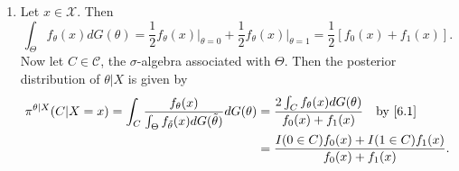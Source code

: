 \documentclass[12pt]{article}
\begin{document}
\begin{enumerate}
  \item Let $x \in \mathcal{X}$. Then
    \begin{equation}
      \int_{\Theta}f_{\theta}(x)dG(\theta) = \frac{1}{2}f_{\theta}(x)\bigg|_{\theta = 0} + \frac{1}{2}f_{\theta}(x)\bigg|_{\theta = 1} =
      \frac{1}{2}[f_0(x) + f_1(x)].
      \label{6.1}
    \end{equation}
    Now let $C \in \mathcal{C}$, the $\sigma$-algebra associated with $\Theta$. Then the posterior distribution of $\theta | X$ is given by
    \begin{align*}
      \pi^{\theta|X}(C|X=x) = \int_{C} \frac{f_{\theta}(x)}{\int_{\Theta}f_{\tilde{\theta}}(x)dG(\tilde{\theta})}dG(\theta) 
      & = \frac{ 2\int_{C}f_{\theta}(x)dG(\theta) }{ f_0(x) + f_1(x) } \ \ \text{ by \eqref{6.1}} \\
      & = \frac{ I(0 \in C) f_0(x) + I(1 \in C)f_1(x) }{ f_0(x) + f_1(x) }.
    \end{align*}


\end{enumerate}
\end{document}
